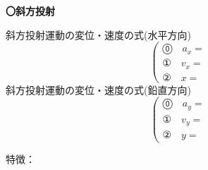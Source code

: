 \documentclass[11pt,twoside,fleqn]{article}
\begin{document}
\begin{itembox}[l]{\textbf{〇斜方投射}}
	\begin{minipage}[t]{0.50\linewidth}
		斜方投射運動の変位・速度の式(水平方向)
		\Large
		\[
		\left(
		\begin{array}{ll}
			\text{⓪} \quad a_x = & \\
			\text{①} \quad v_x = & \\
			\text{②} \quad x = & 
		\end{array}
		\right.
		\]
		\normalsize
		斜方投射運動の変位・速度の式(鉛直方向)
		\Large
		\[
		\left(
		\begin{array}{ll}
			\text{⓪} \quad a_y = & \\
			\text{①} \quad v_y = & \\
			\text{②} \quad y = &
		\end{array}
		\right.
		\]
		\normalsize
	\end{minipage}
	\hfill
	\begin{minipage}[t]{0.50\linewidth}
		\begin{center}
		\end{center}
	\end{minipage}
	\begin{shadebox}
		特徴：\\\\\\\\\\\\\\\\
	\end{shadebox}
\end{itembox}



\clearpage
\end{document}
